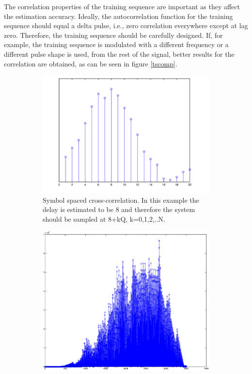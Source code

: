 \documentclass[12pt,a4paper,openright]{article}
\begin{document}
The correlation properties of the training sequence are important as they affect the estimation accuracy. Ideally, the autocorrelation function for the training sequence should equal a delta pulse, i.e., zero correlation everywhere except at lag zero. Therefore, the training sequence should be carefully designed. If, for example, the training sequence is modulated with a different frequency or a different pulse shape is used, from the rest of the signal, better results for the correlation are obtained, as can be seen in figure \ref{tscomp}. 

\begin{figure}[h] 
  \begin{subfigure}[b]{0.5\linewidth}
    \centering
    \includegraphics[width=1\linewidth]{ss.pdf} 
    \caption{Symbol spaced cross-correlation. In this example the delay is estimated to be 8 and therefore the system should be sampled at 8+kQ, k=0,1,2,..N.} 
    \label{a} 
    \vspace{4ex}
  \end{subfigure}%
  \quad
  \begin{subfigure}[b]{0.5\linewidth}
    \centering
    \includegraphics[width=1\linewidth]{20.eps} 

\end{subfigure}
\end{figure}
\end{document}
